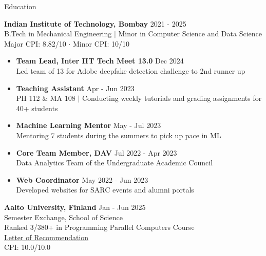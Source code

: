\documentclass{resume}
\begin{document}
\begin{rSection}{Education}
    \vspace*{0.1in}

    {\bf Indian Institute of Technology, Bombay} \hfill {2021 - 2025} \\
    B.Tech in Mechanical Engineering $|$ Minor in Computer Science and Data Science\\
    Major CPI: 8.82/10 $\cdot$ Minor CPI: 10/10

    \begin{itemize}[leftmargin=1.5em, itemsep=0.1em]
    \item \textbf{Team Lead, Inter IIT Tech Meet 13.0} \hfill Dec 2024\\
    {\small Led team of 13 for Adobe deepfake detection challenge to 2nd runner up}
    \item \textbf{Teaching Assistant} \hfill Apr - Jun 2023\\
    {\small PH 112 \& MA 108 $|$ Conducting weekly tutorials and grading assignments for 40+ students}
    \item \textbf{Machine Learning Mentor} \hfill May - Jul 2023\\
    {\small Mentoring 7 students during the summers to pick up pace in ML}
    \item \textbf{Core Team Member, DAV} \hfill Jul 2022 - Apr 2023\\
    {\small Data Analytics Team of the Undergraduate Academic Council}
    \item \textbf{Web Coordinator} \hfill May 2022 - Jun 2023\\
    {\small Developed websites for SARC events and alumni portals}
    \end{itemize}

    \vspace{0.1in}

    {\bf Aalto University, Finland} \hfill {Jan - Jun 2025} \\
    Semester Exchange, School of Science\\
    Ranked 3/380+ in Programming Parallel Computers Course\\
    \href{https://darshanmakwana412.github.io/assets/pdfs/ppc_lor.pdf}{Letter of Recommendation}\\
    CPI: 10.0/10.0

    \end{rSection}
\end{document}
